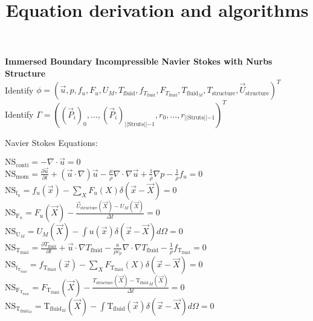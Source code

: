 \documentclass[10pt]{article} %
\title{Equation derivation and algorithms}
\date{}
\begin{document}
	\maketitle

\begin{center}
	\textbf{ Immersed Boundary Incompressible Navier Stokes with Nurbs Structure}\\
	Identify $\phi= \left(\vec{u},p,f_u,F_u,U_M,T_{\text{fluid}},f_{T_{\text{fluid}}},F_{T_{\text{fluid}}},T_{\text{fluid}_M},T_{\text{structure}},\vec{U}_\text{structure}\right)^T$\\
	Identify $\Gamma= \left((\vec{P}_{i})_0,...,(\vec{P}_{i})_{\lvert\lvert \text{Struts}\lvert\lvert-1},r_0,...,r_{\lvert\lvert \text{Struts}\lvert\lvert-1} \right)^T$\\
\begin{flushleft}
	Navier Stokes Equations:
\end{flushleft}
	$ \text{NS}_{\text{conti}} =- \nabla \cdot \vec{u} = 0$\\
	$ \text{NS}_{\text{mom}} = \frac{\partial \vec{u}}{\partial t} + (\vec{u} \cdot \nabla) \vec{u} - \frac{\mu}{\rho} \nabla \cdot \nabla \vec{u} + \frac{1}{\rho} \nabla p - \frac{1}{\rho} f_u = 0$\\
	$\text{NS}_{\text{f}_u} = f_u (\vec{x}) - \sum_{X} F_u (X) \delta (\vec{x}-\vec{X}) = 0$\\
	$\text{NS}_{\text{F}_u} = F_u (\vec{X}) - \frac{\vec{U}_\text{structure} (\vec{X}) - U_M(\vec{X})}{\Delta t} = 0$\\
	$\text{NS}_{\text{U}_M} = U_M (\vec{X}) - \int u(\vec{x}) \delta(\vec{x}-\vec{X}) d \Omega= 0$\\
	$\text{NS}_{\text{T}_{\text{fluid}}} = \frac{\partial T_{\text{fluid}}}{\partial t} + \vec{u} \cdot \nabla T_{\text{fluid}} - \frac{\kappa}{\rho c_p} \nabla \cdot \nabla T_{\text{fluid}} - \frac{1}{\rho} f_{\text{T}_{\text{fluid}}} = 0$\\
	$\text{NS}_{\text{f}_{\text{T}_{\text{fluid}}}} = f_{\text{T}_{\text{fluid}}} (\vec{x}) - \sum_{X} F_{\text{T}_{\text{fluid}}} (X) \delta (\vec{x}-\vec{X}) = 0$\\
	$\text{NS}_{\text{F}_{\text{T}_{\text{fluid}}}} = F_{\text{T}_{\text{fluid}}} (\vec{X}) - \frac{T_{\text{structure}} (\vec{X}) - {\text{T}_{\text{fluid}}}_M(\vec{X})}{\Delta t} = 0$\\
	$\text{NS}_{\text{T}_{\text{fluid}_M}} = \text{T}_{\text{fluid}_M} (\vec{X}) - \int {\text{T}_{\text{fluid}}}(\vec{x}) \delta(\vec{x}-\vec{X}) d \Omega= 0$\\

\end{center}
\end{document}
